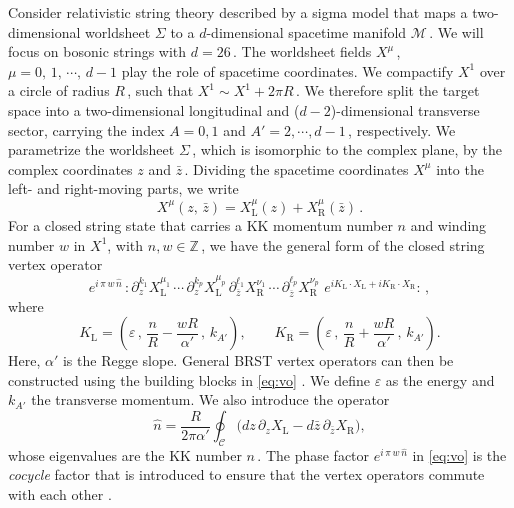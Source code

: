 \documentclass[11pt]{article}
\newcommand{\be}{\begin{equation}}
\newcommand{\ee}{\end{equation}}
\newcommand{\CC}{\mathcal{C}}
\newcommand{\CM}{\mathcal{M}}
\newcommand{\lr}{\left (}
\newcommand{\rr}{\right )}
\newcommand{\p}{\partial}
\begin{document}
Consider relativistic string theory described by a sigma model that maps a two-dimensional worldsheet $\Sigma$ to a $d$-dimensional spacetime manifold $\CM$\,. We will focus on bosonic strings with $d=26$\,. The worldsheet fields $X^\mu$\,, $\mu = 0,\, 1, \, \cdots, \, d-1$ play the role of spacetime coordinates. We compactify $X^1$ over a circle of radius $R$\,, such that $X^1 \sim X^1 + 2\pi R$\,.
%
We therefore split the target space into a two-dimensional longitudinal and ($d-2$)-dimensional transverse sector, carrying the index $A = 0, 1$ and $A' = 2, \cdots, d-1$\,, respectively.  
%
We parametrize the worldsheet $\Sigma$\,, which is isomorphic to the complex plane, by the complex coordinates $z$ and $\bar{z}$\,. Dividing the spacetime coordinates $X^\mu$ into the left- and right-moving parts, we write
%
\be
    X^\mu (z,\, \bar{z}) = X^\mu_\text{L} (z) + X^\mu_\text{R} (\bar{z})\,.
\ee
%
For a closed string state that carries a KK momentum number $n$ and winding number $w$ in $X^1$, with $n, w \in \mathbb{Z}$\,, we have the general form of the closed string vertex operator 
%
\be \label{eq:vo}
    e^{i \, \pi \, w \, \hat{n}} \, :\! \p_z^{k_1} \! X^{\mu_1}_{\text{L}}  \, \cdots \, \p_{z}^{k_p} \! X^{\mu_p}_{\text{L}} \,
    \p_{\overline{z}}^{\ell_1} \! X^{\nu_1}_{\text{R}} \, \cdots \, \p_{\overline{z}}^{\ell_p} \! X^{\nu_p}_{\text{R}} \,\, e^{i K_\text{L} \cdot X_\text{L} + i K_\text{R} \cdot X_\text{R}} \!:\,,
\ee
%
where 
%
\be \label{eq:klr}
    K_{\text{L}} = \lr \varepsilon\,, \, \frac{n}{R} - \frac{wR}{{\alpha}'}\,, \, k_{A'} \rr,
        \qquad%
    K_{\text{R}} = \lr \varepsilon\,, \, \frac{n}{R} + \frac{wR}{{\alpha}{}'}\,, \, k_{A'} \rr.
\ee
%
Here, ${\alpha}{}'$ is the Regge slope. General BRST vertex operators can then be constructed using the building blocks in \eqref{eq:vo} \cite{Gomis:2021ire}. We define $\varepsilon$ as the energy and $k_{A'}$ the transverse momentum. We also introduce the operator 
%
\be
    \hat{n} = \frac{R}{2\pi \alpha'} \oint_\CC \bigl( dz \, \p_z X_\text{L} - d\bar{z} \, \p_{\bar{z}} X_\text{R} \bigr),
\ee
%
whose eigenvalues are the KK number $n$\,. The phase factor $e^{i \, \pi \, w \, \hat{n}}$ in \eqref{eq:vo} is the \emph{cocycle} factor that is introduced to ensure that the vertex operators commute with each other \cite{Polchinski:1998rq}.  
\end{document}
